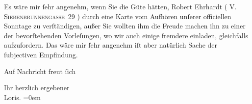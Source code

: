                Es wäre mir ſehr angenehm, wenn Sie die Güte hätten, 
               Robert Ehrhardt
                (
               \textsc{V. Siebenbrunnengasse 29}
               ) durch eine Karte vom Aufhören unſerer officiellen Sonntage zu verſtändigen,
               außer 
               {\pb}
               Sie wollten ihm die Freude
               machen ihn zu einer der bevorſtehenden Vorleſungen, wo wir auch einige fremdere
               einladen, gleichfalls aufzufordern. Das wäre mir ſehr angenehm iſt aber natürlich
               Sache der ſubjectiven Empfindung.
            \pend
           
\pstart
           Auf Nachricht freut ſich\pend
           
\pstart
           
               Ihr herzlich ergebener
               {\\[\baselineskip]}\spacefill\mbox{Loris.}\pend
           \leftskip=0em{}\endnumbering{}  
      